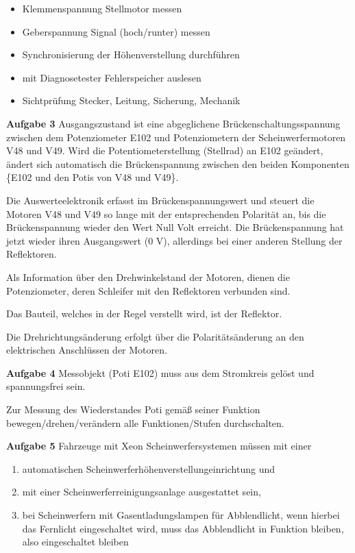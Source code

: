 \begin{itemize}
\item
  Klemmenspannung Stellmotor messen
\item
  Geberspannung Signal (hoch/runter) messen
\item
  Synchronisierung der Höhenverstellung durchführen
\item
  mit Diagnosetester Fehlerspeicher auslesen
\item
  Sichtprüfung Stecker, Leitung, Sicherung, Mechanik
\end{itemize}

\textbf{Aufgabe 3} Ausgangszustand ist eine abgeglichene
Brückenschaltungsspannung zwischen dem Potenziometer E102 und
Potenziometern der Scheinwerfermotoren V48 und V49. Wird die
Potentiometerstellung (Stellrad) an E102 geändert, ändert sich
automatisch die Brückenspannung zwischen den beiden Komponenten \{E102
und den Potis von V48 und V49\}.

Die Auswerteelektronik erfasst im Brückenspannungswert und steuert die
Motoren V48 und V49 so lange mit der entsprechenden Polarität an, bis
die Brückenspannung wieder den Wert Null Volt erreicht. Die
Brückenspannung hat jetzt wieder ihren Ausgangswert (0 V), allerdings
bei einer anderen Stellung der Reflektoren.

Als Information über den Drehwinkelstand der Motoren, dienen die
Potenziometer, deren Schleifer mit den Reflektoren verbunden sind.

Das Bauteil, welches in der Regel verstellt wird, ist der Reflektor.

Die Drehrichtungsänderung erfolgt über die Polaritätsänderung an den
elektrischen Anschlüssen der Motoren.

\textbf{Aufgabe 4} Messobjekt (Poti E102) muss aus dem Stromkreis gelöst
und spannungsfrei sein.

Zur Messung des Wiederstandes Poti gemäß seiner Funktion
bewegen/drehen/verändern alle Funktionen/Stufen durchschalten.

\textbf{Aufgabe 5} Fahrzeuge mit Xeon Scheinwerfersystemen müssen mit
einer

\begin{enumerate}
\item
  automatischen Scheinwerferhöhenverstellungeinrichtung und
\item
  mit einer Scheinwerferreinigungsanlage ausgestattet sein,
\item
  bei Scheinwerfern mit Gasentladungslampen für Abblendlicht, wenn
  hierbei das Fernlicht eingeschaltet wird, muss das Abblendlicht in
  Funktion bleiben, also eingeschaltet bleiben
\end{enumerate}

